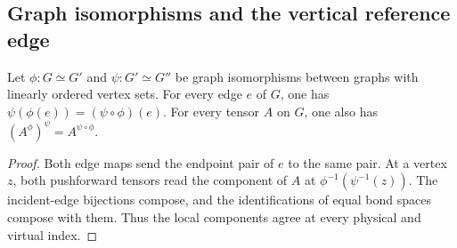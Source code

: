 \subsection{Graph isomorphisms and the vertical reference edge}
\label{subsec:peps_witness_transport}

\begin{lemma}%
    \label{thm:peps_graph_transport_composition}
    \leanok
    Let $\phi:G\simeq G'$ and $\psi:G'\simeq G''$ be graph
    isomorphisms between graphs with linearly ordered vertex sets.
    For every edge $e$ of $G$, one has
    $\psi(\phi(e))=(\psi\circ\phi)(e)$.
    For every tensor $A$ on $G$, one also has
    $(A^\phi)^\psi=A^{\psi\circ\phi}$.
\end{lemma}
\begin{proof}\leanok
    Both edge maps send the endpoint pair of $e$ to the same pair.
    At a vertex $z$, both pushforward tensors read the component of $A$
    at $\phi^{-1}(\psi^{-1}(z))$. The incident-edge bijections compose,
    and the identifications of equal bond spaces compose with them.
    Thus the local components agree at every physical and virtual index.
\end{proof}

